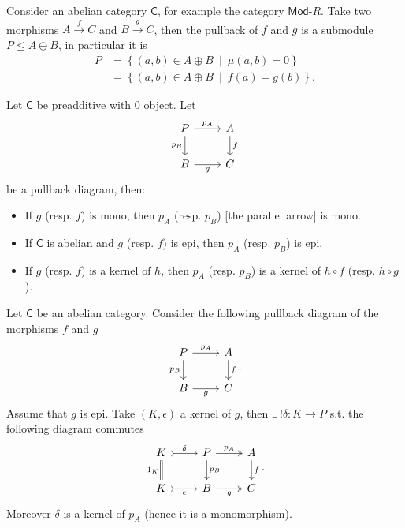 \begin{ex}
	Consider an abelian category $\mathsf{C}$, for example the category $\mathsf{Mod}\text{-}R$.
	Take two morphisms $A \xrightarrow{f} C$ and $B \xrightarrow{g} C$, then the pullback of $f$ and $g$ is a submodule $P \leq A \oplus B$, in particular it is
	\begin{align}
		P &= \left\{ \left( a,b \right) \in A \oplus B \ \middle|\ \mu \left(a, b\right) = 0 \right\}\\
		  &= \left\{ \left(a, b\right) \in A \oplus B \ \middle|\ f(a) = g(b) \right\}
	.\end{align} 
\end{ex} 

\begin{prop}
	Let $\mathsf{C}$ be preadditive with $0$ object.
	Let 
	\begin{equation}
	\begin{tikzcd}
		P \arrow[r, "p_A", rightarrow] \arrow[d, "p_B"', rightarrow] & A \arrow[d, "f", rightarrow] \\
		B \arrow[r, "g"', rightarrow] & C
	\end{tikzcd}
	\end{equation} 
	be a pullback diagram, then:
	\begin{itemize}
		\item If $g$ (resp. $f$) is mono, then $p_A$ (resp. $p_B$) [the parallel arrow] is mono.
		\item If $\mathsf{C}$ is abelian and $g$ (resp. $f$) is epi, then $p_A$ (resp. $p_B$) is epi.
		\item If $g$ (resp. $f$) is a kernel of $h$, then $p_A$ (resp. $p_B$) is a kernel of $h \circ f$ (resp. $h \circ g$).
	\end{itemize}
\end{prop} 

\begin{ex}
	Let $\mathsf{C}$ be an abelian category.
	Consider the following pullback diagram of the morphisms $f$ and $g$
	\begin{equation}
	\begin{tikzcd}
		P \arrow[r, "p_A", rightarrow] \arrow[d, "p_B"', rightarrow] &
		A \arrow[d, "f", rightarrow] \\
		B \arrow[r, "g"', rightarrow] &
		C
	\end{tikzcd}
	.\end{equation} 
	Assume that $g$ is epi.
	Take $\left(K, \epsilon\right)$ a kernel of $g$, then
	$\exists\, ! \delta\colon K \to P$ s.t. the following diagram commutes
	\begin{equation}
	\begin{tikzcd}
		K \arrow[r, "\delta", tail] & %
		P \arrow[r, "p_A", twoheadrightarrow] \arrow[d, "p_B", rightarrow] &
		A \arrow[d, "f", rightarrow] \\
		K \arrow[r, "\epsilon"', tail] \arrow[u, "1_K", equal] &
		B \arrow[r, "g"', twoheadrightarrow] &
		C
	\end{tikzcd}
	.\end{equation} 
	Moreover $\delta$ is a kernel of $p_A$ (hence it is a monomorphism).
\end{ex} 

